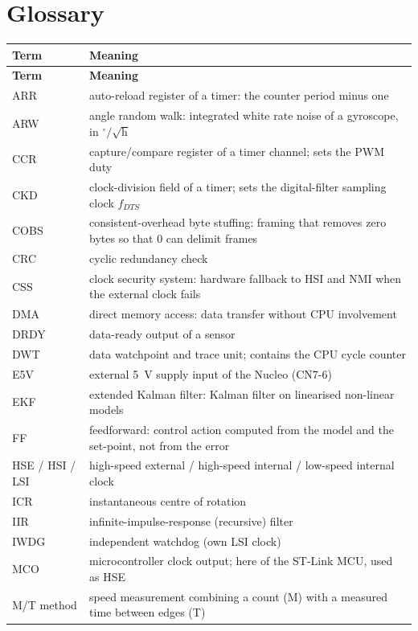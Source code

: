 \documentclass[11pt,a4paper]{article}
\begin{document}
\section{Glossary}\label{app:glossary}

{\small
\begin{xltabular}{\textwidth}{@{}lL@{}}
\toprule
\textbf{Term} & \textbf{Meaning}\\
\midrule
\endfirsthead
\toprule
\textbf{Term} & \textbf{Meaning}\\
\midrule
\endhead
\bottomrule
\endfoot
ARR & auto-reload register of a timer: the counter period minus one\\
ARW & angle random walk: integrated white rate noise of a gyroscope, in $^\circ/\sqrt{\mathrm{h}}$\\
CCR & capture/compare register of a timer channel; sets the PWM duty\\
CKD & clock-division field of a timer; sets the digital-filter sampling clock $f_{DTS}$\\
COBS & consistent-overhead byte stuffing: framing that removes zero bytes so that 0 can delimit frames\\
CRC & cyclic redundancy check\\
CSS & clock security system: hardware fallback to HSI and NMI when the external clock fails\\
DMA & direct memory access: data transfer without CPU involvement\\
DRDY & data-ready output of a sensor\\
DWT & data watchpoint and trace unit; contains the CPU cycle counter\\
E5V & external \qty{5}{V} supply input of the Nucleo (CN7-6)\\
EKF & extended Kalman filter: Kalman filter on linearised non-linear models\\
FF & feedforward: control action computed from the model and the set-point, not from the error\\
HSE / HSI / LSI & high-speed external / high-speed internal / low-speed internal clock\\
ICR & instantaneous centre of rotation\\
IIR & infinite-impulse-response (recursive) filter\\
IWDG & independent watchdog (own LSI clock)\\
MCO & microcontroller clock output; here of the ST-Link MCU, used as HSE\\
M/T method & speed measurement combining a count (M) with a measured time between edges (T)\\

\end{xltabular}}
\end{document}
